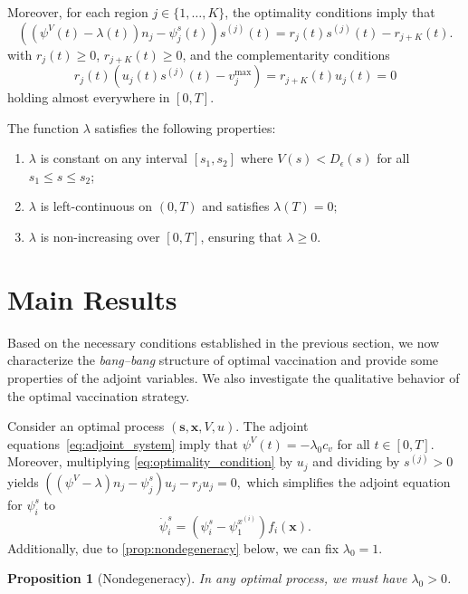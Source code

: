 \documentclass[letterpaper, 10 pt, conference]{ieeeconf}
\newcommand{\fori}[1]{#1 \in \{1,\dots, K\}}
\newtheorem{proposition}{Proposition}
\begin{document}
Moreover, for each region $\fori{j}$, the optimality conditions imply that
\begin{equation}
    \label{eq:optimality_condition}
    ((\psi^V(t) -\! \lambda(t))n_j -\! \psi_j^s(t)) s^{(j)}(t) = r_j(t) s^{(j)}(t) -\! r_{j+K}(t).
\end{equation}
with $r_j(t) \ge 0$, $r_{j+K}(t) \ge 0$, and the complementarity conditions
\begin{equation}
    \label{eq:complementarity}
    r_j(t) \left(u_j(t) s^{(j)}(t) - v_j^{\max} \right) = r_{j+K}(t) u_j(t) = 0
\end{equation}
holding almost everywhere in $[0,T]$.

The function $\lambda$ satisfies the following properties:
\begin{enumerate}
    \item[(i)] $\lambda$ is constant on any interval $[s_1, s_2]$ where $V(s) < D_{\epsilon}(s)$ for all $s_1 \leq s \leq s_2$;
    \item[(ii)] $\lambda$ is left-continuous on $(0,T)$ and satisfies $\lambda(T) = 0;$
    \item[(iii)] $\lambda$ is non-increasing over $[0,T]$, ensuring that $\lambda \geq 0$.
\end{enumerate}

\section{Main Results}
\label{sec:main_results}

Based on the necessary conditions established in the previous section, we now characterize the {\it bang--bang} structure of optimal vaccination and provide some properties of the adjoint variables.
We also investigate the qualitative behavior of the optimal vaccination strategy.

Consider an optimal process $(\boldsymbol{s}, \boldsymbol{x}, V, u)$.
The adjoint equations~\eqref{eq:adjoint_system} imply that $\psi^V(t) = -\lambda_0 c_v$ for all $t \in [0,T]$.
Moreover, multiplying \eqref{eq:optimality_condition} by $u_j$ and dividing by $s^{(j)} > 0$ yields
$
((\psi^V - \lambda) n_j - \psi_j^s) u_j - r_j u_j = 0,
$
which simplifies the adjoint equation for $\psi_i^s$ to
\[
\dot\psi_i^s = (\psi^s_i - \psi^{x^{(i)}}_1) f_i(\boldsymbol{x}). 
\]
Additionally, due to \autoref{prop:nondegeneracy} below, we can fix $\lambda_0 = 1$.

\begin{proposition}[Nondegeneracy]
    \label{prop:nondegeneracy}
    In any optimal process, we must have $\lambda_0 > 0$.
\end{proposition}
\end{document}
